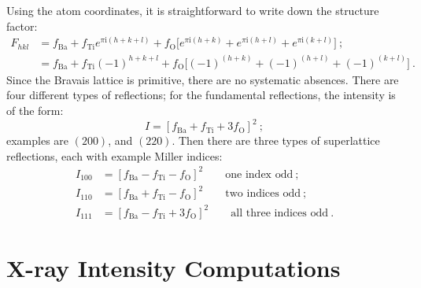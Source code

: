 Using the atom coordinates, it is straightforward to write down the structure factor:
\begin{equation*}
\begin{split}
	F_{hkl} &=  f_{\text{Ba}} +  f_{\text{Ti}} e^{\pi \mathrm{i}(h+k+l)} +  f_{\text{O}} \Big[e^{\pi \mathrm{i}(h+k)} + e^{\pi \mathrm{i}(h+l)} + e^{\pi \mathrm{i}(k+l)} \Big]\ ; \\
                     &= f_{\text{Ba}} +  f_{\text{Ti}} (-1)^{h+k+l} +  f_{\text{O}} \Big[(-1)^{(h+k)} + (-1)^{(h+l)} + (-1)^{(k+l)} \Big]\ .
\end{split}
\end{equation*}
Since the Bravais lattice is primitive, there are no systematic absences.  There are four different types of reflections; for the fundamental reflections, the intensity is of the form:
\[
	I = \left[f_{\text{Ba}}+f_{\text{Ti}}+ 3f_{\text{O}} \right]^2\ ;
\]
examples are $(200)$, and $(220)$. Then there are three types of superlattice reflections, each with example Miller indices:
\begin{equation*}
\begin{split}
	I_{100} &= \left[f_{\text{Ba}}-f_{\text{Ti}}- f_{\text{O}} \right]^2\qquad \text{one index odd}\ ;\\
	I_{110} &= \left[f_{\text{Ba}}+f_{\text{Ti}}- f_{\text{O}} \right]^2\qquad\text{two indices odd}\ ;\\
	I_{111} &= \left[f_{\text{Ba}}-f_{\text{Ti}}+3 f_{\text{O}} \right]^2\qquad\!\!\!\text{all three indices odd}\ .
\end{split}
\end{equation*}



\section{X-ray Intensity Computations}\label{\chabbr:sec:Icomputations}

